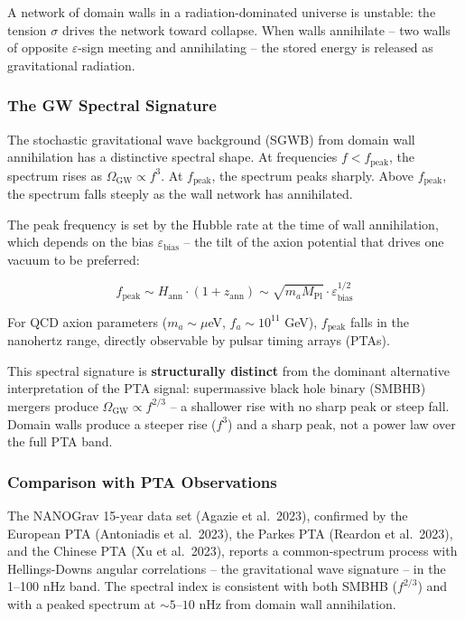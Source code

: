 \documentclass[12pt,a4paper]{article}
\begin{document}
A network of domain walls in a radiation-dominated universe is unstable:
the tension \(\sigma\) drives the network toward collapse. When walls
annihilate -- two walls of opposite \(\varepsilon\)-sign meeting and
annihilating -- the stored energy is released as gravitational
radiation.

\hypertarget{the-gw-spectral-signature}{%
\subsubsection{The GW Spectral
Signature}\label{the-gw-spectral-signature}}

The stochastic gravitational wave background (SGWB) from domain wall
annihilation has a distinctive spectral shape. At frequencies
\(f < f_\text{peak}\), the spectrum rises as
\(\Omega_\text{GW} \propto f^3\). At \(f_\text{peak}\), the spectrum
peaks sharply. Above \(f_\text{peak}\), the spectrum falls steeply as
the wall network has annihilated.

The peak frequency is set by the Hubble rate at the time of wall
annihilation, which depends on the bias \(\varepsilon_\text{bias}\) --
the tilt of the axion potential that drives one vacuum to be preferred:

\[f_\text{peak} \sim H_\text{ann} \cdot (1 + z_\text{ann}) \sim \sqrt{m_a M_\text{Pl}} \cdot \varepsilon_\text{bias}^{1/2}\]

For QCD axion parameters (\(m_a \sim \mu\)eV, \(f_a \sim 10^{11}\) GeV),
\(f_\text{peak}\) falls in the nanohertz range, directly observable by
pulsar timing arrays (PTAs).

This spectral signature is \textbf{structurally distinct} from the
dominant alternative interpretation of the PTA signal: supermassive
black hole binary (SMBHB) mergers produce
\(\Omega_\text{GW} \propto f^{2/3}\) -- a shallower rise with no sharp
peak or steep fall. Domain walls produce a steeper rise (\(f^3\)) and a
sharp peak, not a power law over the full PTA band.

\hypertarget{comparison-with-pta-observations}{%
\subsubsection{Comparison with PTA
Observations}\label{comparison-with-pta-observations}}

The NANOGrav 15-year data set (Agazie et al.~2023), confirmed by the
European PTA (Antoniadis et al.~2023), the Parkes PTA (Reardon et
al.~2023), and the Chinese PTA (Xu et al.~2023), reports a
common-spectrum process with Hellings-Downs angular correlations -- the
gravitational wave signature -- in the 1--100 nHz band. The spectral
index is consistent with both SMBHB (\(f^{2/3}\)) and with a peaked
spectrum at \(\sim 5\)--\(10\) nHz from domain wall annihilation.
\end{document}
